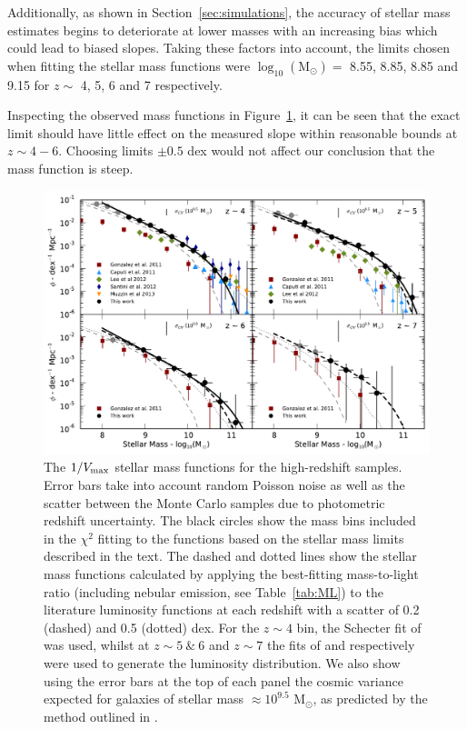 Additionally, as shown in Section~\ref{sec:simulations}, the accuracy of stellar mass estimates begins to deteriorate at lower masses with an increasing bias which could lead to biased slopes. Taking these factors into account, the limits chosen when fitting the stellar mass functions were $\log_{10} (\text{M}_{\odot}) =$ 8.55, 8.85, 8.85 and 9.15 for $z \sim$ 4, 5, 6 and 7 respectively.

Inspecting the observed mass functions in Figure~\ref{fig:massfunctions}, it can be seen that the exact limit should have little effect on the measured slope within reasonable bounds at $z \sim 4-6$. Choosing limits $\pm 0.5$ dex would not affect our conclusion that the mass function is steep.

\begin{figure}
\centering
\includegraphics[width=\textwidth]{plots/fig9.pdf}
\caption[Short caption]{The $1/V_{\rm{max}}$ stellar mass functions for the high-redshift samples. Error bars take into account random Poisson noise as well as the scatter between the Monte Carlo samples due to photometric redshift uncertainty. The black circles show the mass bins included in the $\chi^2$ fitting to the \citet{Schechter:1976gl} functions based on the stellar mass limits described in the text. The dashed and dotted lines show the stellar mass functions calculated by applying the best-fitting mass-to-light ratio (including nebular emission, see Table~\ref{tab:ML}) to the literature luminosity functions at each redshift with a scatter of 0.2 (dashed) and 0.5 (dotted) dex. For the $z\sim4$ bin, the Schecter fit of \citet{2007ApJ...670..928B} was used, whilst at $z\sim5~\&~6$ and $z\sim7$ the fits of \citet{Anonymous:96uKWdy6} and \citet{McLure:2013hh} respectively were used to generate the luminosity distribution. We also show using the error bars at the top of each panel the cosmic variance expected for galaxies of stellar mass $\approx 10^{9.5}$ M$_{\odot}$, as predicted by the method outlined in \citet{Moster:2011ip}.}
\label{fig:massfunctions}
\end{figure}

